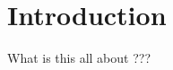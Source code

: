 \renewcommand{\contentsname}{Table of Content}
\tableofcontents

\newpage
\section{Introduction}
What is this all about ???
\newpage